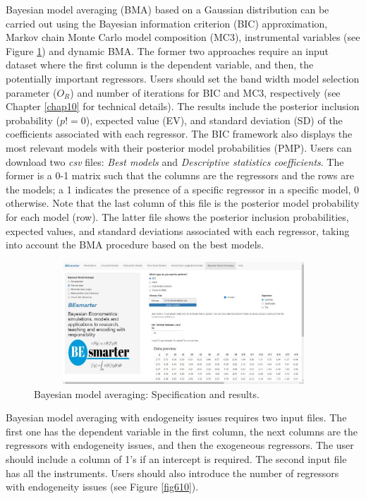 Bayesian model averaging (BMA) based on a Gaussian distribution can be carried out using the Bayesian information criterion (BIC) approximation, Markov chain Monte Carlo model composition (MC3), instrumental variables (see Figure \ref{fig69}) and dynamic BMA. The former two approaches require an input dataset where the first column is the dependent variable, and then, the potentially important regressors.
Users should set the band width model selection parameter ($O_R$) and number of iterations for BIC and MC3, respectively (see Chapter \ref{chap10} for technical details). The results include the posterior inclusion probability ($p!=0$), expected value (EV), and standard deviation (SD) of the coefficients associated with each regressor. The BIC framework also displays the most relevant models with their posterior model probabilities (PMP). Users can download two \textit{csv} files: \textit{Best models} and \textit{Descriptive statistics coefficients}. The former is a 0-1 matrix such that the columns are the regressors and the rows are the models; a 1 indicates the presence of a specific regressor in a specific model, 0 otherwise. Note that the last column of this file is the posterior model probability for each model (row). The latter file shows the posterior inclusion probabilities, expected values, and standard deviations associated with each regressor, taking into account the BMA procedure based on the best models.

\begin{figure}
	\includegraphics[width=340pt, height=130pt]{Chapters/chapterGUI/figures/Figure9.jpg}
	\caption[List of figure caption goes here]{Bayesian model averaging: Specification and results.}\label{fig69}
\end{figure} 

Bayesian model averaging with endogeneity issues requires two input files. The first one has the dependent variable in the first column, the next columns are the regressors with endogeneity issues, and then the exogeneous regressors. The user should include a column of 1's if an intercept is required. The second input file has all the instruments. Users should also introduce the number of regressors with endogeneity issues (see Figure \ref{fig610}).

